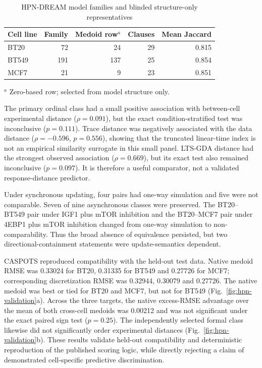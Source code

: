 \documentclass[JMCS,submit]{resources/ISRP}
\theoremstyle{definition}
\theoremstyle{remark}
\numberwithin{equation}{section}
\begin{document}
\begin{table}[t]
\caption{HPN-DREAM model families and blinded structure-only representatives}
\label{tab:hpn-medoids}
\centering
\small
\begin{tabular}{lrrrr}
\toprule
Cell line & Family & Medoid row$^a$ & Clauses & Mean Jaccard \\
\midrule
BT20  & 72  & 24  & 29 & 0.815 \\
BT549 & 191 & 137 & 25 & 0.854 \\
MCF7  & 21  & 9   & 23 & 0.851 \\
\bottomrule
\end{tabular}
\par\smallskip
\raggedright\footnotesize $^a$ Zero-based row; selected from model structure only.
\end{table}

The primary ordinal class had a small positive association with between-cell
experimental distance ($\rho=0.091$), but the exact condition-stratified test was
inconclusive ($p=0.111$). Trace distance was negatively associated with the data
distance ($\rho=-0.596$, $p=0.556$), showing that the truncated linear-time index
is not an empirical similarity surrogate in this small panel. LTS-GDA distance
had the strongest observed association ($\rho=0.669$), but its exact test also
remained inconclusive ($p=0.097$). It is therefore a useful comparator, not a
validated response-distance predictor.

Under synchronous updating, four pairs had one-way simulation and five were not
comparable. Seven of nine asynchronous classes were preserved. The
BT20--BT549 pair under IGF1 plus mTOR inhibition and the BT20--MCF7 pair under
4EBP1 plus mTOR inhibition changed from one-way simulation to
non-comparability. Thus the broad absence of equivalence persisted, but two
directional-containment statements were update-semantics dependent.

CASPOTS reproduced compatibility with the held-out test data. Native medoid RMSE
was 0.33024 for BT20, 0.31335 for BT549 and 0.27726 for MCF7; corresponding
discretization RMSE was 0.32944, 0.30079 and 0.27726. The native medoid was best
or tied for BT20 and MCF7, but not for BT549 (Fig.~\ref{fig:hpn-validation}a).
Across the three targets, the native excess-RMSE advantage over the mean of both
cross-cell medoids was 0.00212 and was not significant under the exact paired
sign test ($p=0.25$). The independently selected formal class likewise did not
significantly order experimental distances (Fig.~\ref{fig:hpn-validation}b).
These results validate held-out compatibility and deterministic reproduction of
the published scoring logic, while directly rejecting a claim of demonstrated
cell-specific predictive discrimination.
\end{document}
